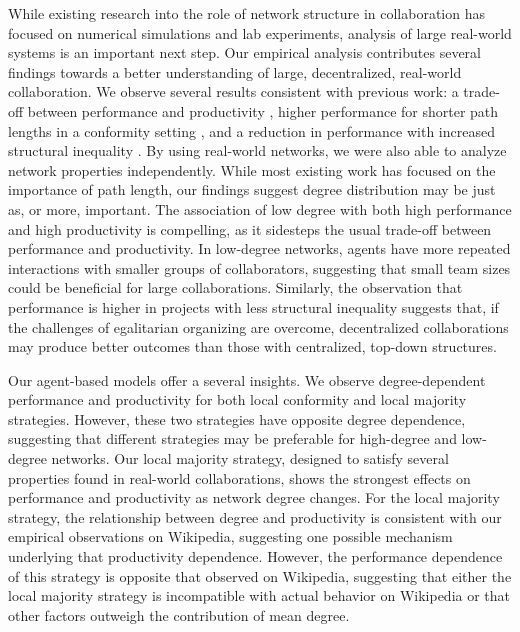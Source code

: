 While existing research into the role of network structure in collaboration
has focused on numerical simulations and lab experiments,
analysis of large real-world systems is an important next step.
Our empirical analysis contributes several findings towards a better
understanding of large, decentralized, real-world collaboration.
We observe several results consistent with previous work:
a trade-off between performance and productivity
\cite{mason_propagation_2008,grim_scientific_2013},
higher performance for shorter path lengths in a conformity setting
\cite{barkoczi_social_2016},
and a reduction in performance with increased structural inequality
\cite{kearns_experiments_2012}.
By using real-world networks, we were also able to analyze network properties independently.
While most existing work has focused on the importance of path length,
our findings suggest degree distribution may be just as, or more, important.
The association of low degree with both high performance and high productivity is compelling,
as it sidesteps the usual trade-off between performance and productivity.
In low-degree networks, agents have more repeated interactions with smaller groups of collaborators, suggesting that small team sizes could be beneficial for large collaborations.
Similarly, the observation that performance is higher in projects with less structural inequality suggests that,
if the challenges of egalitarian organizing are overcome,
decentralized collaborations may produce better outcomes than those with centralized, top-down structures.

Our agent-based models offer a several insights.
We observe degree-dependent performance and productivity
for both local conformity and local majority strategies.
However, these two strategies have opposite degree dependence,
suggesting that different strategies may be preferable for high-degree and low-degree
networks.
Our local majority strategy,
designed to satisfy several properties found in real-world collaborations,
shows the strongest effects on performance and productivity as network degree changes.
For the local majority strategy,
the relationship between degree and productivity is consistent with our
empirical observations on Wikipedia,
suggesting one possible mechanism underlying that productivity dependence.
However, the performance dependence of this strategy
is opposite that observed on Wikipedia,
suggesting that either the local majority strategy
is incompatible with actual behavior on Wikipedia or
that other factors outweigh the contribution of mean degree.

